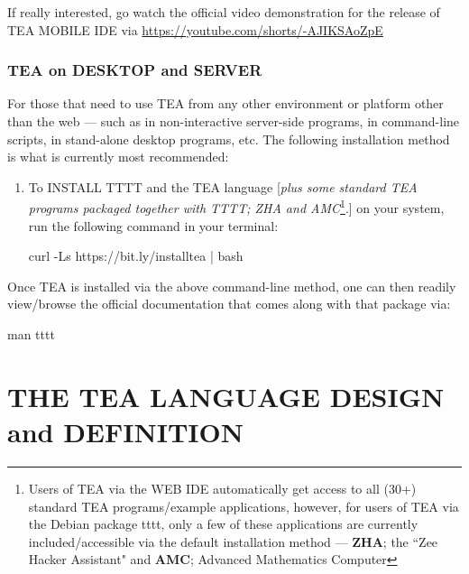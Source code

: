 \documentclass[a4paper, 18pt]{book} %
\begin{document}
\vspace{2em}

If really interested, go watch the official video demonstration for the release of TEA MOBILE IDE via \url{https://youtube.com/shorts/-AJIKSAoZpE}


\subsection{TEA on DESKTOP and SERVER}

For those that need to use TEA from any other environment or platform other than the web --- such as in non-interactive server-side programs, in command-line scripts, in stand-alone desktop programs, etc. The following installation method is what is currently most recommended:

\begin{enumerate}
\item To INSTALL TTTT and the TEA language [\textit{plus some standard TEA programs packaged together with TTTT; ZHA and AMC}\footnote{Users of TEA via the WEB IDE automatically get access to all (30+) standard TEA programs/example applications, however, for users of TEA via the Debian package tttt, only a few of these applications are currently included/accessible via the default installation method --- \textbf{ZHA}; the ``Zee Hacker Assistant" and \textbf{AMC}; Advanced Mathematics Computer}.] on your system, run the following command in your terminal:

    \begin{tcbverbatim}[title=UNIX/Linux TEA installation command]
curl -Ls https://bit.ly/installtea | bash
  \end{tcbverbatim}
\end{enumerate}



Once TEA is installed via the above command-line method, one can then readily view/browse the official documentation that comes along with that package via: 

    \begin{tcbverbatim}[title=UNIX/Linux TEA documentation access command]
 man tttt
  \end{tcbverbatim}





\chapter{THE TEA LANGUAGE DESIGN and DEFINITION}
\label{SEC2}
\end{document}
